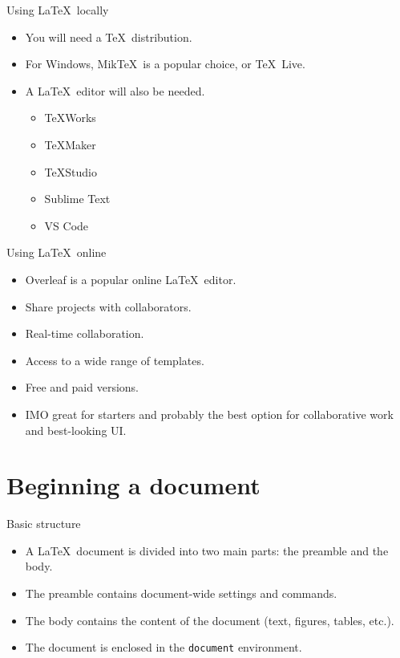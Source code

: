 \documentclass[t,12pt,xcolor=dvipsnames]{beamer}
\begin{document}
\begin{frame}{Using \LaTeX \ locally}
    \begin{itemize}
        \item You will need a \TeX \ distribution.
        \item For Windows, Mik\TeX \ is a popular choice, or \TeX \ Live.
        \item A \LaTeX \ editor will also be needed.
        \begin{itemize}
            \item \TeX Works
            \item \TeX Maker
            \item \TeX Studio
            \item Sublime Text
            \item VS Code
        \end{itemize}
    \end{itemize}
\end{frame}

\begin{frame}{Using \LaTeX \ online}
    \begin{itemize}
        \item Overleaf is a popular online \LaTeX \ editor.
        \item Share projects with collaborators.
        \item Real-time collaboration.
        \item Access to a wide range of templates.
        \item Free and paid versions.
        \item IMO great for starters and probably the best option for collaborative work and best-looking UI.
    \end{itemize}
\end{frame}

\section{Beginning a document}

\begin{frame}{Basic structure}
    \begin{itemize}
        \item A \LaTeX \ document is divided into two main parts: the preamble and the body.
        \item The preamble contains document-wide settings and commands.
        \item The body contains the content of the document (text, figures, tables, etc.).
        \item The document is enclosed in the \texttt{document} environment.
    \end{itemize}
\end{frame}
\end{document}
